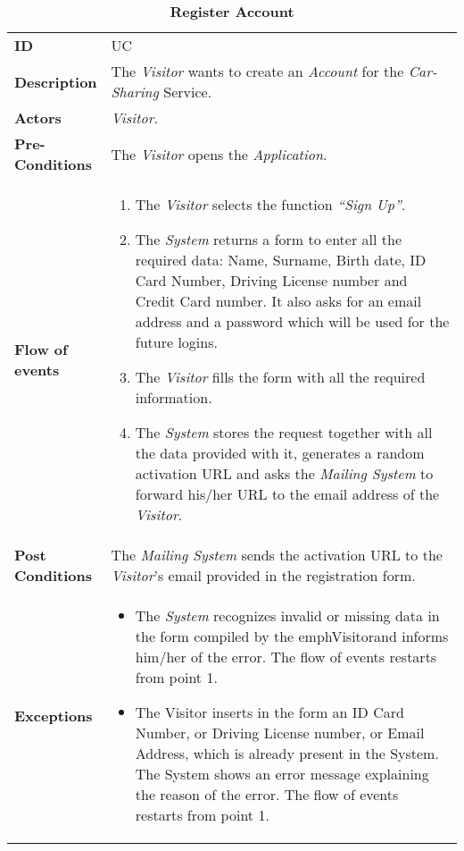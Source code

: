 

\begin{longtable}{|p{0.2\linewidth} | p{0.8\linewidth}|}
	\captionsetup{labelformat=empty} %
	\caption{\textbf{Register Account}} %
	\label{UC_Register}%
	\\ \hline %
	
	\textbf{ID} & UC\theUseCaseIdCounter \\ \hline
	\textbf{Description} & The \emph{Visitor} wants to create an \emph{Account} for the \emph{Car-Sharing} Service. \\ \hline
	\textbf{Actors} & \emph{Visitor}.\\ \hline
	\textbf{Pre-Conditions} & The \emph{Visitor} opens the \emph{Application}. \\ \hline
	\textbf{Flow of events} & 
		\begin{enumerate}
			\item The \emph{Visitor} selects the function \textit{\textquotedblleft{Sign Up}\textquotedblright}.
			\item The \emph{System} returns a form to enter all the required data: Name, Surname, Birth date, ID Card Number, Driving License number and Credit Card number. It also asks for an email address and a password which will be used for the future logins.
			\item The \emph{Visitor} fills the form with all the required information.
			\item The \emph{System} stores the request together with all the data provided with it, generates a random activation URL and asks the \emph{Mailing System} to forward his/her URL to the email address of the \emph{Visitor}.
		\end{enumerate}	 \\ \hline
	\textbf{Post Conditions} & The \emph{Mailing System} sends the activation URL to the \emph{Visitor}'s email provided in the registration form. \\ \hline
	\textbf{Exceptions} & 
		\begin{itemize}
		\item The \emph{System} recognizes invalid or missing data in the form compiled by the emph{Visitor}and informs him/her of the error. The flow of events restarts from point 1.
		\item The Visitor inserts in the form an ID Card Number, or Driving License number, or Email Address, which is already present in the System. The System shows an error message explaining the reason of the error. The flow of events restarts from point 1.
		\end{itemize} \\ \hline
\end{longtable}


